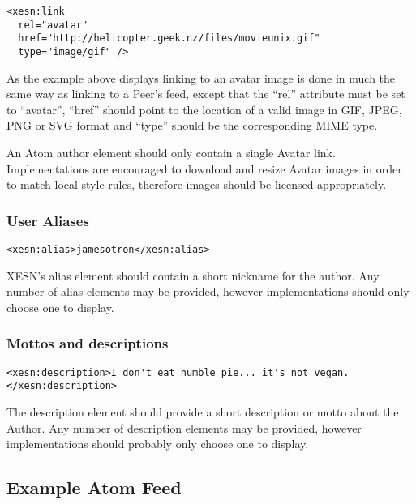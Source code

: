 \documentclass[titlepage,english,a4paper,twoside,dvips]{article}
\begin{document}
\begin{verbatim}
<xesn:link 
  rel="avatar"
  href="http://helicopter.geek.nz/files/movieunix.gif"
  type="image/gif" />
\end{verbatim}

As the example above displays linking to an avatar image is done in much the same way as linking to a Peer's feed, except that the ``rel'' attribute must be set to ``avatar'', ``href'' should point to the location of a valid image in GIF, JPEG, PNG or SVG format and ``type'' should be the corresponding MIME type.

An Atom author element should only contain a single Avatar link.  Implementations are encouraged to download and resize Avatar images in order to match local style rules, therefore images should be licensed appropriately.

\subsubsection{User Aliases}

\begin{verbatim}
<xesn:alias>jamesotron</xesn:alias>
\end{verbatim}

XESN's alias element should contain a short nickname for the author.  Any number of alias elements may be provided, however implementations should only choose one to display.

\subsubsection{Mottos and descriptions}

\begin{verbatim}
<xesn:description>I don't eat humble pie... it's not vegan.</xesn:description>
\end{verbatim}

The description element should provide a short description or motto about the Author.  Any number of description elements may be provided, however implementations should probably only choose one to display.

\subsection{Example Atom Feed}
\end{document}
